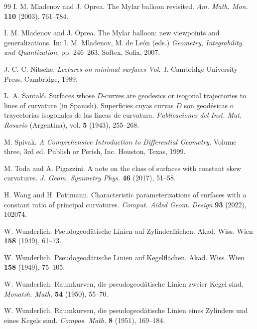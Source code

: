 \documentclass[11pt,a4paper]{article}
\begin{document}
\begin{thebibliography}{99}
I. M. Mladenov and J. Oprea.
The Mylar balloon revisited.
\emph{Am. Math. Mon.} \textbf{110} (2003), 761--784.

I. M. Mladenov and J. Oprea.
The Mylar balloon: new viewpoints and generalizations.
In: I. M. Mladenov, M. de León (eds.) \emph{Geometry, Integrability and Quantization}, pp. 246--263. Softex, Sofia, 2007.

J. C. C. Nitsche.
\emph{Lectures on minimal surfaces Vol. 1}.
Cambridge University Press, Cambridge, 1989.

L. A. Santaló.
Surfaces whose $D$-curves are geodesics or isogonal trajectories to lines of curvature (in Spanish).
Superficies cuyas curvas $D$ son geodésicas o trayectorias isogonales de las líneas de curvatura. \emph{Publicaciones del Inst. Mat. Rosario} (Argentina), vol. \textbf{5} (1943), 255--268.

M. Spivak.
\emph{A Comprehensive Introduction to Differential Geometry}. Volume three, 3rd ed. Publish or Perish, Inc. Houston, Texas, 1999.

M. Toda and A. Pigazzini.
A note on the class of surfaces with constant skew curvatures.
\emph{J. Geom. Symmetry Phys.} \textbf{46} (2017), 51--58.

H. Wang and H. Pottmann.
Characteristic parameterizations of surfaces with a constant ratio of principal curvatures.
\emph{Comput. Aided Geom. Design} \textbf{93} (2022), 102074.

W. Wunderlich.
Pseudogeodätische Linien auf Zylinderflächen.
Akad. Wiss. Wien \textbf{158} (1949), 61--73.

W. Wunderlich.
Pseudogeodätische Linien auf Kegelflächen.
Akad. Wiss. Wien \textbf{158} (1949), 75--105.

W. Wunderlich.
Raumkurven, die pseudogeodätische Linien zweier Kegel sind.
\emph{Monatsh. Math.} \textbf{54} (1950), 55--70.

W. Wunderlich.
Raumkurven, die pseudogeodätische Linien eines Zylinders und eines Kegels sind.
\emph{Compos. Math.} \textbf{8} (1951), 169--184.

\end{thebibliography}
\end{document}
